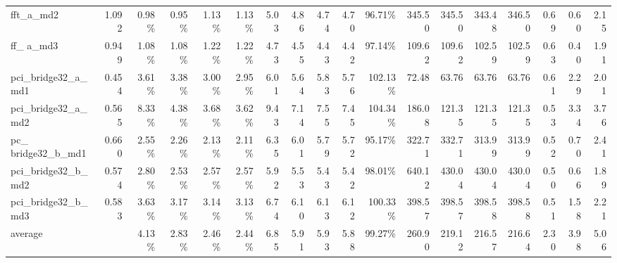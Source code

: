\documentclass{article}
\begin{document}
\begin{center}
\begin{table*}[t]
\begin{center}
\begin{tabular}{|l|r|rrrr|rrrrr|rrrr|rrr|}
   fft\_a\_md2	& 1.092	& 0.98\%	& 0.95\%	& 1.13\%	& 1.13\%	& 5.03	& 4.86	& 4.74	& 4.70	& 96.71\%	& 345.50	& 345.50	& 343.48	& 346.50	& 0.69	& 0.60	& 2.15\\
   ff\_ a\_md3	& 0.949	& 1.08\%	& 1.08\%	& 1.22\%	& 1.22\%	& 4.73	& 4.55	& 4.43	& 4.42	& 97.14\%	& 109.62	& 109.62	& 102.59	& 102.59	& 0.63	& 0.40	& 1.91\\
   pci\_bridge32\_a\_md1	& 0.454	& 3.61\%	& 3.38\%	& 3.00\%	& 2.95\%	& 6.01	& 5.64	& 5.83	& 5.76	& 102.13\%	& 72.48	& 63.76	& 63.76	& 63.76	& 0.61	& 2.29	& 2.01\\
   pci\_bridge32\_a\_md2	& 0.565	& 8.33\%	& 4.38\%	& 3.68\%	& 3.62\%	& 9.43	& 7.14	& 7.55	& 7.45	& 104.34\%	& 186.08	& 121.35	& 121.35	& 121.35	& 0.53	& 3.34	& 3.76\\
   pc\_ bridge32\_b\_md1	& 0.660	& 2.55\%	& 2.26\%	& 2.13\%	& 2.11\%	& 6.35	& 6.01	& 5.79	& 5.72	& 95.17\%	& 322.71	& 332.71	& 313.99	& 313.99	& 0.52	& 0.70	& 2.41\\
   pci\_bridge32\_b\_md2	& 0.574	& 2.80\%	& 2.53\%	& 2.57\%	& 2.57\%	& 5.92	& 5.53	& 5.43	& 5.42	& 98.01\%	& 640.12	& 430.04	& 430.04	& 430.04	& 0.50	& 0.66	& 1.89\\
   pci\_bridge32\_b\_md3	&0.583	& 3.63\%	& 3.17\%	& 3.14\%	& 3.13\%	& 6.74	& 6.10	& 6.13	& 6.12	& 100.33\%	& 398.57	& 398.57	& 398.58	& 398.58	& 0.51	& 1.58	& 2.21\\\midrule
   average	& 	& 4.13\%	& 2.83\%	& 2.46\%	& 2.44\%	& 6.85	& 5.91	& 5.93	& 5.88	& 99.27\%	& 260.90	& 219.12	& 216.57	& 216.64	& 2.30	& 3.98	&5.06\\\bottomrule
   \end{tabular}
    \end{center}
    \end{table*}


\end{center}
\end{document}
